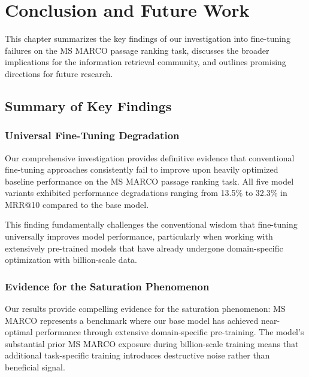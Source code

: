 
\chapter{Conclusion and Future Work} %

\label{Chapter6} %


This chapter summarizes the key findings of our investigation into fine-tuning failures on the MS MARCO passage ranking task, discusses the broader implications for the information retrieval community, and outlines promising directions for future research.

\section{Summary of Key Findings}

\subsection{Universal Fine-Tuning Degradation}

Our comprehensive investigation provides definitive evidence that conventional fine-tuning approaches consistently fail to improve upon heavily optimized baseline performance on the MS MARCO passage ranking task. All five model variants exhibited performance degradations ranging from 13.5\% to 32.3\% in MRR@10 compared to the base model.

This finding fundamentally challenges the conventional wisdom that fine-tuning universally improves model performance, particularly when working with extensively pre-trained models that have already undergone domain-specific optimization with billion-scale data.

\subsection{Evidence for the Saturation Phenomenon}

Our results provide compelling evidence for the saturation phenomenon: MS MARCO represents a benchmark where our base model has achieved near-optimal performance through extensive domain-specific pre-training. The model's substantial prior MS MARCO exposure during billion-scale training means that additional task-specific training introduces destructive noise rather than beneficial signal.

